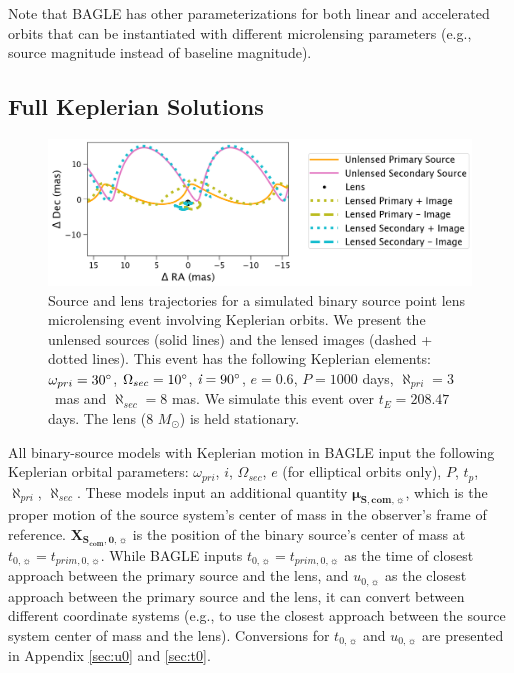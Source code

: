 \documentclass[twocolumn]{aastex701}
\newcommand{\vect}[1]{\boldsymbol{#1}}
\newcommand{\tnot}{t_{0,\sun}}
\newcommand{\uo}{u_{0,\sun}}
\newcommand{\mussysvec}{\vect{\mu}_{\boldsymbol{S, com},\sun}}
\newcommand{\Xscomvec}{\vect{X}_{\boldsymbol{S_{com},0},\sun}}
\newcommand{\tpnot}{t_{prim,0,\sun}}
\newcommand{\w}{\omega_{pri}}
\newcommand{\bigomega}{\Omega_{sec}}
\newcommand{\inclination}{\textit{i}}
\newcommand{\eccentricity}{\textit{e}}
\newcommand{\period}{\textit{P}}
\newcommand{\al}{\aleph_{pri}}
\newcommand{\ala}{\aleph_{sec}}
\begin{document}
Note that BAGLE has other parameterizations for both linear and accelerated orbits that can be instantiated with different microlensing parameters (e.g., source magnitude instead of baseline magnitude).





\subsection{Full Keplerian Solutions}
\label{sec:binsources_kep}
\begin{figure}
    \centering
    \includegraphics[width=  \textwidth] {figures/bspl_keplerian.png}
    \caption{Source and lens trajectories for a simulated binary source point lens microlensing event involving Keplerian orbits. We present the unlensed sources (solid lines) and the lensed images (dashed + dotted lines). This event has the following Keplerian elements: $\w = 30 \degree$, $\bigomega = 10 \degree$, $\inclination = 90 \degree$, $e=0.6$, $\period = 1000$ days, $\al = 3  $~mas and $\ala = 8 $ mas. We simulate this event over $t_E=208.47$ days. The lens (8 $M_\odot$) is held stationary.}
    \label{fig:bspl_keplerian}
\end{figure}

All binary-source models with  Keplerian motion in BAGLE input the following Keplerian orbital parameters: $\w$, $\inclination$, $\bigomega$, $\eccentricity$ (for elliptical orbits only), $\period$, $t_p$, $\al$, $\ala$. These models input an additional quantity $\mussysvec$, which is the proper motion of the source system's center of mass in the observer's frame of reference. $\Xscomvec$ is the position of the binary source's center of mass at $\tnot=\tpnot$. While BAGLE inputs $\tnot = \tpnot$ as the time of closest approach between the primary source and the lens, and $\uo$ as the closest approach between the primary source and the lens, it can convert between different coordinate systems (e.g., to use the closest approach between the source system center of mass and the lens). Conversions for
$\tnot$ and $\uo$ are presented in Appendix \ref{sec:u0} and \ref{sec:t0}.
\end{document}

